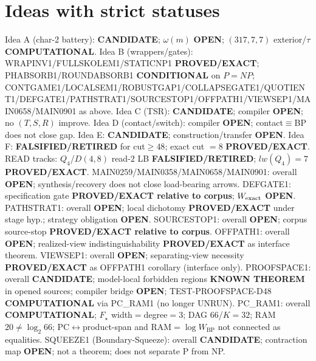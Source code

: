 \documentclass[11pt]{article}
\begin{document}
\section*{Ideas with strict statuses}
Idea A (char-2 battery): \textbf{CANDIDATE}; $\omega(m)$ \textbf{OPEN}; $(317,7,7)$ exterior/$\tau$ \textbf{COMPUTATIONAL}.
Idea B (wrappers/gates): WRAPINV1/FULLSKOLEM1/STATICNP1 \textbf{PROVED/EXACT};
PHABSORB1/ROUNDABSORB1 \textbf{CONDITIONAL} on $P=NP$;
CONTGAME1/LOCALSEM1/ROBUSTGAP1/COLLAPSEGATE1/QUOTIENT1/DEFGATE1/PATHSTRAT1/SOURCESTOP1/OFFPATH1/VIEWSEP1/MAIN0658/MAIN0901 as above.
Idea C (TSR): \textbf{CANDIDATE}; compiler \textbf{OPEN}; no $(T,S,R)$ improve.
Idea D (contact/switch): compiler \textbf{OPEN}; contact$\equiv$BP does not close gap.
Idea E: \textbf{CANDIDATE}; construction/transfer \textbf{OPEN}.
Idea F: \textbf{FALSIFIED/RETIRED} for cut$\ge48$; exact cut $=8$ \textbf{PROVED/EXACT}.
READ tracks: $Q_4$/$D(4,8)$ read-$2$ LB \textbf{FALSIFIED/RETIRED}; $lw(Q_4)=7$ \textbf{PROVED/EXACT}.
MAIN0259/MAIN0358/MAIN0658/MAIN0901: overall \textbf{OPEN}; synthesis/recovery does not close load-bearing arrows.
DEFGATE1: specification gate \textbf{PROVED/EXACT relative to corpus}; $W_{\rm exact}$ \textbf{OPEN}.
PATHSTRAT1: overall \textbf{OPEN}; local dichotomy \textbf{PROVED/EXACT} under stage hyp.; strategy obligation \textbf{OPEN}.
SOURCESTOP1: overall \textbf{OPEN}; corpus source-stop \textbf{PROVED/EXACT relative to corpus}.
OFFPATH1: overall \textbf{OPEN}; realized-view indistinguishability \textbf{PROVED/EXACT} as interface theorem.
VIEWSEP1: overall \textbf{OPEN}; separating-view necessity \textbf{PROVED/EXACT} as OFFPATH1 corollary (interface only).
PROOFSPACE1: overall \textbf{CANDIDATE}; model-local forbidden regions \textbf{KNOWN THEOREM} in opened sources;
compiler bridge \textbf{OPEN}; TEST-PROOFSPACE-D48 \textbf{COMPUTATIONAL} via PC\_RAM1 (no longer UNRUN).
PC\_RAM1: overall \textbf{COMPUTATIONAL}; $F_\star$ width$=$degree$=3$; DAG $66$/$K{=}32$; RAM $20\neq\log_2 66$;
PC$\leftrightarrow$product-span and RAM$=\log W_{\mathrm{BP}}$ not connected as equalities.
SQUEEZE1 (Boundary-Squeeze): overall \textbf{CANDIDATE}; contraction map \textbf{OPEN}; not a theorem;
does not separate P from NP.
\end{document}
